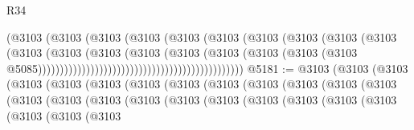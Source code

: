 \begin{lexlean}{R34}
\begin{coremodule}
                                                            (@3103
                                                              (@3103
                                                                (@3103
                                                                  (@3103
                                                                    (@3103
                                                                      (@3103
                                                                        (@3103
                                                                          (@3103
                                                                            (@3103
                                                                              (@3103
                                                                                (@3103
                                                                                  (@3103
                                                                                    (@3103
                                                                                      (@3103
                                                                                        (@3103
                                                                                          (@3103
                                                                                            (@3103
                                                                                              (@3103
                                                                                                (@3103
                                                                                                  @5085)))))))))))))))))))))))))))))))))))))))))))))))
@5181 := @3103
    (@3103
      (@3103
        (@3103
          (@3103
            (@3103
              (@3103
                (@3103
                  (@3103
                    (@3103
                      (@3103
                        (@3103
                          (@3103
                            (@3103
                              (@3103
                                (@3103
                                  (@3103
                                    (@3103
                                      (@3103
                                        (@3103
                                          (@3103
                                            (@3103
                                              (@3103
                                                (@3103
                                                  (@3103
                                                    (@3103

\end{coremodule}
\end{lexlean}
